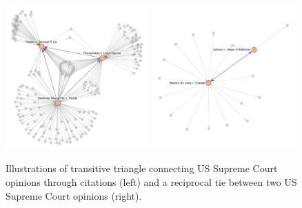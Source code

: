 \documentclass{cup-pan}
\begin{document}
\begin{figure}[bt]
\centering
\includegraphics[width = 0.49\textwidth,trim= 2cm 2cm 3cm 2cm,clip=true ]{citations_trans.pdf}\hspace{0.2cm}
\includegraphics[width = 0.49\textwidth,trim= 2cm 2cm 3cm 2cm,clip=true ]{citations_recip.pdf}
\caption{Illustrations of transitive triangle connecting US Supreme Court opinions through citations (left) and a reciprocal tie between two US Supreme Court opinions (right).}
\label{fig:transitivity}
\end{figure}
\end{document}
